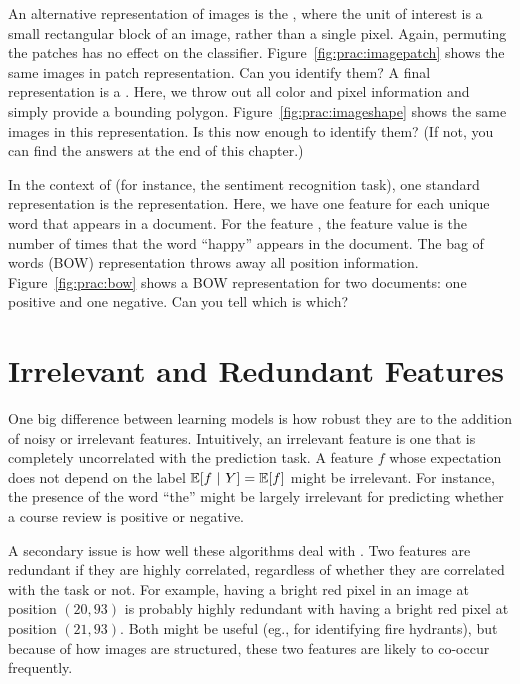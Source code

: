 An alternative representation of images is the , where the unit of interest is a small rectangular
block of an image, rather than a single pixel.  Again, permuting the
patches has no effect on the classifier.
Figure~\ref{fig:prac:imagepatch} shows the same images in patch
representation.  Can you identify them?  A final representation is a
.  Here, we throw out all color and
pixel information and simply provide a bounding polygon.
Figure~\ref{fig:prac:imageshape} shows the same images in this
representation.  Is this now enough to identify them?  (If not, you
can find the answers at the end of this chapter.)


In the context of  (for instance, the
sentiment recognition task), one standard representation is the
 representation.  Here, we have one feature for
each unique word that appears in a document.  For the feature
, the feature value is the number of times that the word
``happy'' appears in the document.  The bag of words (BOW)
representation throws away all position information.
Figure~\ref{fig:prac:bow} shows a BOW representation for two
documents: one positive and one negative.  Can you tell which is
which?

\section{Irrelevant and Redundant Features}

One big difference between learning models is how robust they are to
the addition of noisy or irrelevant features.  Intuitively, an
irrelevant feature is one that is completely uncorrelated with the
prediction task.  A feature $f$ whose expectation does not depend on
the label $\mathbb{E}[f \textrm{~}\arrowvert\textrm{~} Y] = \mathbb{E}[f]$ might be irrelevant.  For instance,
the presence of the word ``the'' might be largely irrelevant for
predicting whether a course review is positive or negative.  


A secondary issue is how well these algorithms deal with
.  Two features are redundant if they are
highly correlated, regardless of whether they are correlated with the
task or not.  For example, having a bright red pixel in an image at
position $(20,93)$ is probably highly redundant with having a bright
red pixel at position $(21,93)$.  Both might be useful (eg., for
identifying fire hydrants), but because of how images are structured,
these two features are likely to co-occur frequently.

